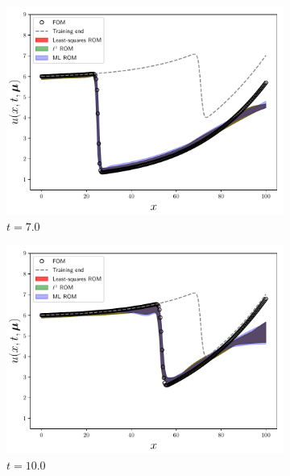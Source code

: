\documentclass[3p,computermodern,10pt]{elsarticle}
\begin{document}
\begin{figure}
\begin{center}
\begin{subfigure}[t]{0.24\textwidth}
\includegraphics[trim={0cm 0cm 0cm 0cm},clip,width=1.0\linewidth]{code/burgers/synapse_models/elu/results/usolExtrapolate2_0001.pdf} 
\caption{$t=7.0$}
\end{subfigure}
\begin{subfigure}[t]{0.24\textwidth}
\includegraphics[trim={0cm 0cm 0cm 0cm},clip,width=1.0\linewidth]{code/burgers/synapse_models/elu/results/usolExtrapolate2_0003.pdf} 
\caption{$t=10.0$}
\end{subfigure}
\begin{subfigure}[t]{0.24\textwidth}

\end{subfigure}
\end{center}
\end{figure}
\end{document}
